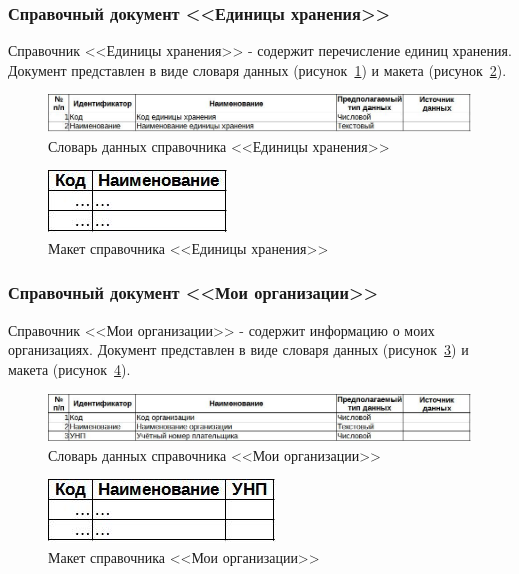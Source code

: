 \subsubsection{Справочный документ <<Единицы хранения>>}

Справочник <<Единицы хранения>> - содержит перечисление единиц хранения.
Документ представлен в виде словаря данных (рисунок~\ref{fig:CP_EdXran_tipi})
и макета (рисунок~\ref{fig:CP_EdXran_maket}).

\begin{figure}[!h]
    \centering
    \includegraphics[width=14cm]
        {_docs/СП_ЕдХран_типы.jpg}
    \caption{Словарь данных справочника <<Единицы хранения>>}
    \label{fig:CP_EdXran_tipi}
\end{figure}

\begin{figure}[!h]
    \centering
    \includegraphics[]
        {_docs/СП_ЕдХран_макет.jpg}
    \caption{Макет справочника <<Единицы хранения>>}
    \label{fig:CP_EdXran_maket}
\end{figure}

\subsubsection{Справочный документ <<Мои организации>>}

Справочник <<Мои организации>> - содержит информацию о моих организациях.
Документ представлен в виде словаря данных (рисунок~\ref{fig:CP_MoiOrg_tipi})
и макета (рисунок~\ref{fig:CP_MoiOrg_maket}).

\begin{figure}[!h]
    \centering
    \includegraphics[width=14cm]
        {_docs/СП_МоиОрг_типы.jpg}
    \caption{Словарь данных справочника <<Мои организации>>}
    \label{fig:CP_MoiOrg_tipi}
\end{figure}

\begin{figure}[!h]
    \centering
    \includegraphics[]
        {_docs/СП_МоиОрг_макет.jpg}
    \caption{Макет справочника <<Мои организации>>}
    \label{fig:CP_MoiOrg_maket}
\end{figure}

